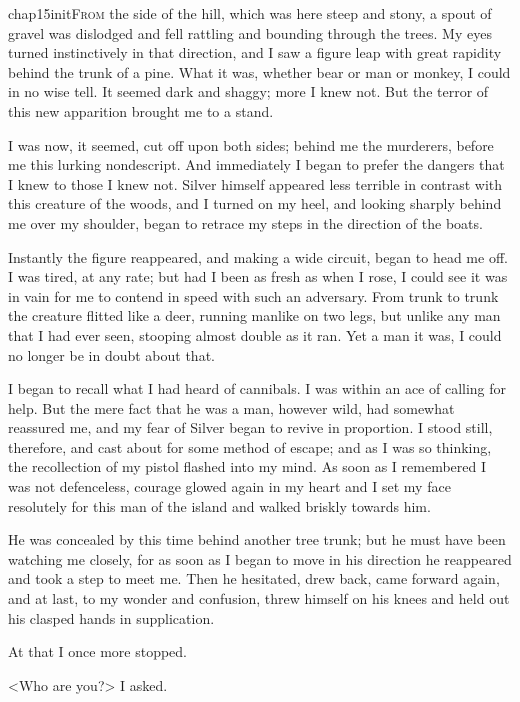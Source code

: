
 \lettrine{chap15initF}{rom} the side of the hill, which was here steep and stony, a spout of gravel was dislodged and fell rattling and bounding through the trees. My eyes turned instinctively in that direction, and I saw a figure leap with great rapidity behind the trunk of a pine. What it was, whether bear or man or monkey, I could in no wise tell. It seemed dark and shaggy; more I knew not. But the terror of this new apparition brought me to a stand.

I was now, it seemed, cut off upon both sides; behind me the murderers, before me this lurking nondescript. And immediately I began to prefer the dangers that I knew to those I knew not. Silver himself appeared less terrible in contrast with this creature of the woods, and I turned on my heel, and looking sharply behind me over my shoulder, began to retrace my steps in the direction of the boats.

Instantly the figure reappeared, and making a wide circuit, began to head me off. I was tired, at any rate; but had I been as fresh as when I rose, I could see it was in vain for me to contend in speed with such an adversary. From trunk to trunk the creature flitted like a deer, running manlike on two legs, but unlike any man that I had ever seen, stooping almost double as it ran. Yet a man it was, I could no longer be in doubt about that.

I began to recall what I had heard of cannibals. I was within an ace of calling for help. But the mere fact that he was a man, however wild, had somewhat reassured me, and my fear of Silver began to revive in proportion. I stood still, therefore, and cast about for some method of escape; and as I was so thinking, the recollection of my pistol flashed into my mind. As soon as I remembered I was not defenceless, courage glowed again in my heart and I set my face resolutely for this man of the island and walked briskly towards him.

He was concealed by this time behind another tree trunk; but he must have been watching me closely, for as soon as I began to move in his direction he reappeared and took a step to meet me. Then he hesitated, drew back, came forward again, and at last, to my wonder and confusion, threw himself on his knees and held out his clasped hands in supplication.

At that I once more stopped.

<Who are you?> I asked.

